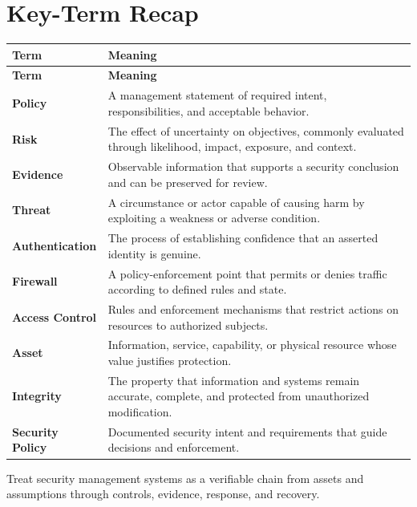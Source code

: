 \documentclass[11pt]{article}
\begin{document}
\section*{Key-Term Recap}
\begin{longtable}{>{\RaggedRight\arraybackslash}p{}>{\RaggedRight\arraybackslash}p{}}
\toprule\rowcolor{Navy}\color{white}\textbf{Term} & \color{white}\textbf{Meaning}\\\midrule
\endfirsthead
\toprule\rowcolor{Navy}\color{white}\textbf{Term} & \color{white}\textbf{Meaning}\\\midrule
\endhead
\textbf{Policy} & A management statement of required intent, responsibilities, and acceptable behavior. \\\midrule
\textbf{Risk} & The effect of uncertainty on objectives, commonly evaluated through likelihood, impact, exposure, and context. \\\midrule
\textbf{Evidence} & Observable information that supports a security conclusion and can be preserved for review. \\\midrule
\textbf{Threat} & A circumstance or actor capable of causing harm by exploiting a weakness or adverse condition. \\\midrule
\textbf{Authentication} & The process of establishing confidence that an asserted identity is genuine. \\\midrule
\textbf{Firewall} & A policy-enforcement point that permits or denies traffic according to defined rules and state. \\\midrule
\textbf{Access Control} & Rules and enforcement mechanisms that restrict actions on resources to authorized subjects. \\\midrule
\textbf{Asset} & Information, service, capability, or physical resource whose value justifies protection. \\\midrule
\textbf{Integrity} & The property that information and systems remain accurate, complete, and protected from unauthorized modification. \\\midrule
\textbf{Security Policy} & Documented security intent and requirements that guide decisions and enforcement. \\\midrule
\bottomrule
\end{longtable}
\begin{takeawaybox}
Treat security management systems as a verifiable chain from assets and assumptions through controls, evidence, response, and recovery.
\end{takeawaybox}
\end{document}
